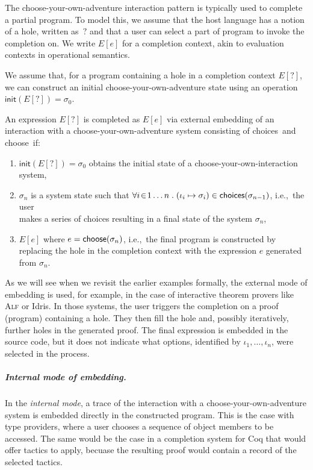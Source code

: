 \documentclass[a4paper,UKenglish,cleveref, autoref, thm-restate]{lipics-v2021}
\newcommand{\ident}[1]{\textsf{#1}}
\newcommand{\sigmaN}{\sigma_0}
\newcommand{\select}{\textnormal{\ident{choose}}}
\newcommand{\choices}{\textnormal{\ident{choices}}}
\begin{document}
The choose-your-own-adventure interaction pattern is typically used to complete a partial program.
To model this, we assume that the host language has a notion of a hole, written as~$?$
and that a user can select a part of program to invoke the completion on. We write $E[e]$ for a
completion context, akin to evaluation contexts in operational semantics.

We assume that, for a program containing a hole in a completion context $E[?]$, we can construct
an initial choose-your-own-adventure state using an operation
$\ident{init}(E[?])=\sigmaN$.

\begin{definition}\label{def:external}
An expression $E[?]$ is completed as $E[e]$ via external embedding of an interaction with
a choose-your-own-adventure system consisting of \choices\ and \select\ if:

\vspace{-0.5em}
\raggedright
\begin{enumerate}
\item $\ident{init}(E[?]) = \sigmaN$ obtains the initial state of a choose-your-own-interaction system,
\item $\sigma_n$ is a system state such that $\forall i\!\in\! 1\ldots n\;.\;(\iota_i\mapsto\sigma_i)\in\choices{(\sigma_{n-1})}$,
  i.e.,~the user\\ makes a series of choices resulting in a final state of the system $\sigma_n$,
\item $E[e]$ where $e=\select(\sigma_n)$, i.e.,~the final program is constructed by replacing the hole
  in the completion context with the expression $e$ generated from $\sigma_n$.
\end{enumerate}
\end{definition}

As we will see when we revisit the earlier examples formally, the external mode of embedding is
used, for example, in the case of interactive theorem provers like \textsc{Alf} or Idris.
In those systems, the user triggers the completion on a proof (program) containing a hole.
They then fill the hole and, possibly iteratively, further holes in the generated proof. The final
expression is embedded in the source code, but it does not indicate what options, identified by
$\iota_1, \ldots, \iota_n$, were selected in the process.

\subparagraph{Internal mode of embedding.}
In the \emph{internal mode}, a trace of the interaction with a choose-your-own-adventure system
is embedded directly in the constructed program. This is the case with type providers, where a
user chooses a sequence of object members to be accessed. The same would be the case in a completion
system for Coq that would offer tactics to apply, becuase the resulting proof would contain a
record of the selected tactics.
\end{document}
